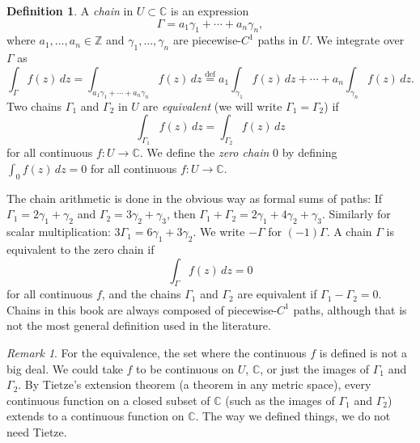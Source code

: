 \documentclass[12pt,openany]{book}
\newcommand{\C}{{\mathbb{C}}}
\newcommand{\Z}{{\mathbb{Z}}}
\newcommand{\myindex}[1]{#1\index{#1}}
\theoremstyle{plain}
\theoremstyle{remark}
\newtheorem{remark}[thm]{Remark}
\theoremstyle{definition}
\newtheorem{defn}[thm]{Definition}
\theoremstyle{exercise}
\theoremstyle{example}
\begin{document}
\begin{defn}
A \emph{\myindex{chain}} in $U \subset \C$ is an expression
\begin{equation*}
\Gamma = a_1 \gamma_1 + \cdots + a_n \gamma_n ,
\end{equation*}
where $a_1,\ldots,a_n \in \Z$ and $\gamma_1,\ldots,\gamma_n$
are piecewise-$C^1$ paths in $U$.  We integrate over $\Gamma$ as
%
\begin{equation*}
\int_{\Gamma} f(z) \, dz
=
\int_{a_1 \gamma_1 + \cdots + a_n \gamma_n} f(z) \, dz
\overset{\text{def}}{=}
a_1 \int_{\gamma_1} f(z) \, dz +
\cdots
+
a_n \int_{\gamma_n} f(z) \, dz .
\end{equation*}
Two chains $\Gamma_1$ and $\Gamma_2$ in 
$U$ are
\emph{equivalent} (we will write
%
$\Gamma_1=\Gamma_2$) if
\begin{equation*}
\int_{\Gamma_1} f(z) \, dz = 
\int_{\Gamma_2} f(z) \, dz
\end{equation*}
for all continuous $f \colon U \to \C$.
We define the \emph{\myindex{zero chain}} $0$ by defining 
$\int_0 f(z) \, dz = 0$ for all continuous $f \colon U \to \C$.
\end{defn}

The chain arithmetic is done in the obvious way as formal sums of paths:
If $\Gamma_1 = 2 \gamma_1 + \gamma_2$ and $\Gamma_2 = 3 \gamma_2 +
\gamma_3$, then $\Gamma_1 + \Gamma_2 = 2 \gamma_1 + 4 \gamma_2 + \gamma_3$.
Similarly for scalar multiplication: $3 \Gamma_1 = 6 \gamma_1 + 3 \gamma_2$.
%
We write $-\Gamma$ for $(-1)\Gamma$.
A chain $\Gamma$ is equivalent to the zero chain if
\begin{equation*}
\int_\Gamma f(z)\, dz = 0
\end{equation*}
for all continuous $f$, and
the chains $\Gamma_1$ and $\Gamma_2$ are equivalent if $\Gamma_1 - \Gamma_2 = 0$.
Chains in this book are always composed of piecewise-$C^1$ paths,
although that is not the most general definition used in the literature.

\begin{remark}
For the equivalence,
the set where the continuous $f$ is defined is not a big deal.  We could
take $f$ to be continuous on $U$, $\C$, or just the images of
$\Gamma_1$ and $\Gamma_2$.
By Tietze's extension theorem (a theorem in any metric space),
every continuous function on a closed subset of
$\C$ (such as the images of $\Gamma_1$ and $\Gamma_2$) extends to a
continuous function on $\C$.
The way we defined things, we do not need Tietze.
\end{remark}
\end{document}
